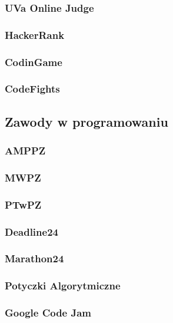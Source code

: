 \subsubsection{UVa Online Judge}

\subsubsection{HackerRank}

\subsubsection{CodinGame}

\subsubsection{CodeFights}


\subsection{Zawody w programowaniu}\label{subsec:contests}

\subsubsection{AMPPZ}

\subsubsection{MWPZ}\label{subsubsec:mwpz}

\subsubsection{PTwPZ}

\subsubsection{Deadline24}

\subsubsection{Marathon24}

\subsubsection{Potyczki Algorytmiczne}

\subsubsection{Google Code Jam}

